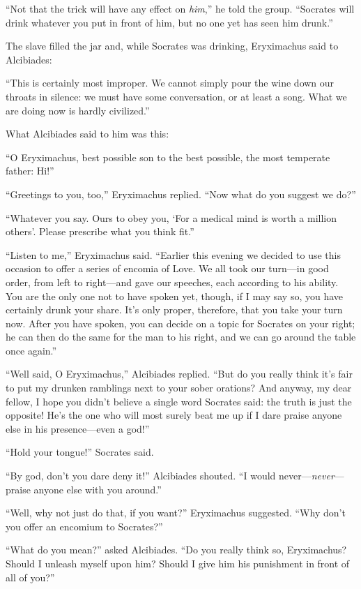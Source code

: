 “Not that the trick will have any effect on {\em him},” he told the
group. “Socrates will drink whatever you put in front of him, but no one
yet has seen him drunk.”

The slave filled the jar and, while Socrates was drinking, Eryximachus
said to Alcibiades:

 “This is certainly most improper. We cannot simply pour the wine
down our throats in silence: we must have some conversation, or at least
a song. What we are doing now is hardly civilized.”

What Alcibiades said to him was this:

“O Eryximachus, best possible son to the best possible, the most
temperate father: Hi!”

“Greetings to you, too,” Eryximachus replied. “Now what do you suggest
we do?”

“Whatever you say. Ours to obey you, ‘For a medical mind is worth a
million others'.
Please prescribe what you think fit.”

 “Listen to me,” Eryximachus said. “Earlier this evening we
decided to use this occasion to offer a series of encomia of Love. We
all took our turn---in good order, from left to right---and gave our
speeches, each according to his ability. You are the only one not to
have spoken yet, though, if I may say so, you have certainly drunk your
share. It's only proper, therefore, that you take your turn now. After
you have spoken, you can decide on a topic for Socrates on your right;
he can then do the same for the man to his right, and we can go around
the table once again.”

“Well said, O Eryximachus,” Alcibiades replied. “But do you really think
it's fair to put my drunken ramblings next to your sober orations? And
 anyway, my dear fellow, I hope you didn't believe a single word
Socrates said: the truth is just the opposite! He's the one who will
most surely beat me up if I dare praise anyone else in his
presence---even a god!”

“Hold your tongue!” Socrates said.

“By god, don't you dare deny it!” Alcibiades shouted. “I would
never---{\em never}---praise anyone else with you around.”

 “Well, why not just do that, if you want?” Eryximachus
suggested. “Why don't you offer an encomium to Socrates?”

“What do you mean?” asked Alcibiades. “Do you really think so,
Eryximachus? Should I unleash myself upon him? Should I give him his
punishment in front of all of you?”

